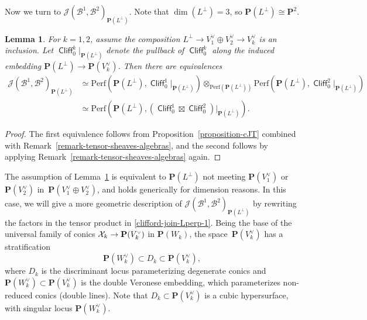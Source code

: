 \documentclass[11pt, reqno]{amsart}
\numberwithin{equation}{section}
\theoremstyle{plain}
\newtheorem{lemma}[theorem]{Lemma}
\theoremstyle{definition}
\newcommand{\Perf}{\mathrm{Perf}}
\newcommand{\svee}{\scriptscriptstyle\vee}
\DeclareMathOperator{\Cl}{\mathsf{Cliff}}
\newcommand{\vV}{V^{\svee}}
\newcommand{\vW}{W^{\svee}}
\newcommand{\cB}{\mathcal{B}}
\newcommand{\cJ}{\mathcal{J}}
\newcommand{\ccX}{\CMcal{X}}
\newcommand{\bP}{\mathbf{P}}
\begin{document}
Now we turn to $\cJ(\cB^1, \cB^2)_{\bP(L^{\perp})}$. 
Note that $\dim(L^\perp) = 3$, so $\bP(L^\perp) \cong \bP^2$.

\begin{lemma}
\label{lemma-JL-Cl}
For $k=1,2$, assume the composition $L^{\perp} \to \vV_1 \oplus \vV_2 \to \vV_k$ is an inclusion. 
Let $\Cl_0^k\vert_{\bP(L^{\perp})}$ denote the pullback of $\Cl_0^k$ along the induced 
embedding $\bP(L^\perp) \to \bP(\vV_k)$. 
Then there are equivalences 
\begin{align}
\label{clifford-join-Lperp-1}
\cJ(\cB^1, \cB^2)_{\bP(L^{\perp})} & \simeq 
\Perf {\left(\bP(L^{\perp}), \Cl_0^1\vert_{\bP(L^{\perp})} \right)} \otimes_{\Perf(\bP(L^{\perp}))}  \Perf {\left(\bP(L^{\perp}), \Cl_0^2\vert_{\bP(L^{\perp})} \right)} \\ 
\label{clifford-join-Lperp-2}
& \simeq 
\Perf{ \left(\bP(L^{\perp}), (\Cl_0^1 \boxtimes \Cl_0^2)\vert_{\bP(L^{\perp})} \right)} . 
\end{align}
\end{lemma}

\begin{proof}
The first equivalence follows from Proposition~\ref{proposition-cJT} combined with Remark~\ref{remark-tensor-sheaves-algebras}, 
and the second follows by applying Remark~\ref{remark-tensor-sheaves-algebras} again. 
\end{proof} 

The assumption of Lemma~\ref{lemma-JL-Cl} is equivalent to $\bP(L^{\perp})$ not meeting  
$\bP(\vV_1)$ or $\bP(\vV_2)$ in~$\bP(\vV_1 \oplus \vV_2)$, and holds generically for dimension reasons. 
In this case, we will give a more geometric description of $\cJ(\cB^1, \cB^2)_{\bP(L^{\perp})}$ 
by rewriting the factors in the tensor product in \eqref{clifford-join-Lperp-1}. 
Being the base of the universal family of conics $\ccX_k \to \bP(\vV_k)$ in $\bP(W_k)$, 
the space~$\bP(\vV_k)$ has a stratification 
\begin{equation*}
\bP(\vW_k) \subset D_k \subset \bP(\vV_k), 
\end{equation*}
where $D_k$ is the discriminant locus parameterizing degenerate conics 
and $\bP(\vW_k) \subset \bP(\vV_k)$ is the double Veronese embedding, which parameterizes non-reduced conics (double lines). 
Note that $D_k \subset \bP(\vV_k)$ is a cubic hypersurface, with singular locus $\bP(\vW_k)$. 
\end{document}
